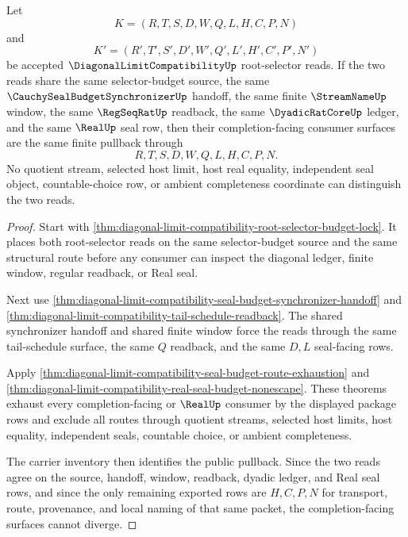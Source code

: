 \begin{theorem}
\label{thm:diagonal-limit-compatibility-root-selector-window-pullback-uniqueness}
Let
$$
K=(R,T,S,D,W,Q,L,H,C,P,N)
$$
and
$$
K'=(R',T',S',D',W',Q',L',H',C',P',N')
$$
be accepted $\DiagonalLimitCompatibilityUp$ root-selector reads. If the two reads share the same selector-budget source, the same $\CauchySealBudgetSynchronizerUp$ handoff, the same finite $\StreamNameUp$ window, the same $\RegSeqRatUp$ readback, the same $\DyadicRatCoreUp$ ledger, and the same $\RealUp$ seal row, then their completion-facing consumer surfaces are the same finite pullback through
$$
R,T,S,D,W,Q,L,H,C,P,N .
$$
No quotient stream, selected host limit, host real equality, independent seal object, countable-choice row, or ambient completeness coordinate can distinguish the two reads.
\end{theorem}
\begin{proof}
Start with \autoref{thm:diagonal-limit-compatibility-root-selector-budget-lock}. It places both root-selector reads on the same selector-budget source and the same structural route before any consumer can inspect the diagonal ledger, finite window, regular readback, or Real seal.

Next use \autoref{thm:diagonal-limit-compatibility-seal-budget-synchronizer-handoff} and \autoref{thm:diagonal-limit-compatibility-tail-schedule-readback}. The shared synchronizer handoff and shared finite window force the reads through the same tail-schedule surface, the same $Q$ readback, and the same $D,L$ seal-facing rows.

Apply \autoref{thm:diagonal-limit-compatibility-seal-budget-route-exhaustion} and \autoref{thm:diagonal-limit-compatibility-real-seal-budget-nonescape}. These theorems exhaust every completion-facing or $\RealUp$ consumer by the displayed package rows and exclude all routes through quotient streams, selected host limits, host equality, independent seals, countable choice, or ambient completeness.

The carrier inventory then identifies the public pullback. Since the two reads agree on the source, handoff, window, readback, dyadic ledger, and Real seal rows, and since the only remaining exported rows are $H,C,P,N$ for transport, route, provenance, and local naming of that same packet, the completion-facing surfaces cannot diverge.
\end{proof}

